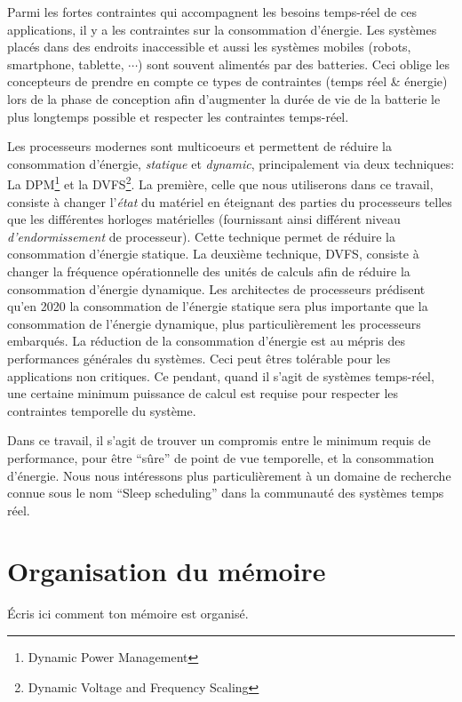Parmi les fortes contraintes qui accompagnent les besoins temps-réel
de ces applications, il y a les contraintes sur la consommation
d'énergie. Les systèmes placés dans des endroits inaccessible et aussi
les systèmes mobiles (robots, smartphone, tablette, $\cdots$) sont
souvent alimentés par des batteries. Ceci oblige les concepteurs de
prendre en compte ce types de contraintes (temps réel \& énergie) lors
de la phase de conception afin d'augmenter la durée de vie de la
batterie le plus longtemps possible et respecter les contraintes
temps-réel.

Les processeurs modernes sont multicoeurs et permettent de réduire la
consommation d'énergie, \emph{statique} et \emph{dynamic},
principalement via deux techniques: La \textsc{DPM}\footnote{Dynamic
  Power Management} et la \textsc{DVFS}\footnote{Dynamic Voltage and
  Frequency Scaling}. La première, celle que nous utiliserons dans ce
travail, consiste à changer l'\emph{état} du matériel en éteignant des
parties du processeurs telles que les différentes horloges matérielles
(fournissant ainsi différent niveau \emph{d'endormissement} de
processeur). Cette technique permet de réduire la consommation
d'énergie statique. La deuxième technique, DVFS, consiste à changer la
fréquence opérationnelle des unités de calculs afin de réduire la
consommation d'énergie dynamique. Les architectes de processeurs
prédisent qu'en 2020 la consommation de l'énergie statique sera plus
importante que la consommation de l'énergie dynamique, plus
particulièrement les processeurs embarqués. La réduction de la
consommation d'énergie est au mépris des performances générales du
systèmes. Ceci peut êtres tolérable pour les applications non
critiques. Ce pendant, quand il s'agit de systèmes temps-réel, une
certaine minimum puissance de calcul est requise pour respecter les
contraintes temporelle du système.


Dans ce travail, il s'agit de trouver un compromis entre le minimum
requis de performance, pour \^etre ``s\^ure'' de point de vue
temporelle, et la consommation d'énergie. Nous nous intéressons plus
particulièrement à un domaine de recherche connue sous le nom ``Sleep
scheduling'' dans la communauté des systèmes temps réel.


\section*{Organisation du mémoire}

Écris ici comment ton mémoire est organisé. 
